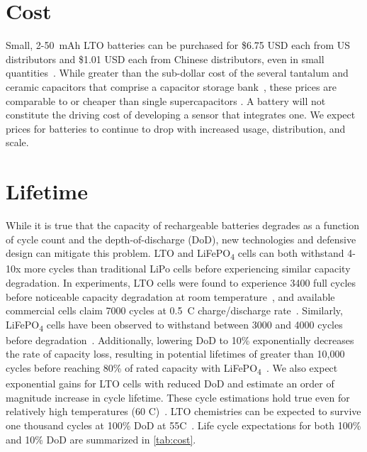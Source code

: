 \section{Cost}
\label{chap:battery-cost}
Small, 2-50~mAh LTO batteries can be purchased for
\$6.75 USD each from US distributors and \$1.01 USD each from Chinese distributors, even in small quantities~\cite{LTODatasheet, LTODatasheet2}. While greater than the sub-dollar cost of the several tantalum and ceramic capacitors that comprise a
capacitor storage bank~\cite{ceramicDatasheet, tantalumDatasheet}, these prices are comparable to or cheaper than single supercapacitors \cite{kemetCap, murataCap, seikoCap, bestCap}.
A battery will not constitute
the driving cost of developing a sensor that integrates one. We expect prices
for batteries to continue to drop with increased usage, distribution, and
scale.




\section{Lifetime}

While it is true that the capacity of rechargeable batteries degrades as a function
of cycle count and the depth-of-discharge (DoD), new technologies and defensive design
can mitigate this problem. LTO and LiFePO\textsubscript{4} cells can both withstand
4-10x more cycles than traditional
LiPo cells before experiencing similar capacity
degradation. In experiments, LTO cells were found to experience 3400 full
cycles before noticeable capacity degradation at room temperature~\cite{hallExperimental18}, and
available commercial cells claim 7000 cycles at 0.5~C charge/discharge
rate~\cite{LTODatasheet2}.
Similarly,
LiFePO\textsubscript{4} cells have been observed to withstand between 3000 and
4000 cycles before degradation~\cite{omarLithium14, wangCycle11,
sarasketaCycle15}.  Additionally, lowering DoD to 10\%
exponentially decreases the rate of capacity loss, resulting in potential
lifetimes of greater than 10,000 cycles before reaching 80\% of rated capacity
with LiFePO\textsubscript{4}~\cite{omarLithium14, wangCycle11}.
We
also expect exponential gains for LTO cells with reduced DoD and estimate an order
of magnitude increase in cycle lifetime.
These cycle estimations hold true even for relatively high temperatures (60\textdegree
C)~\cite{wangCycle11}.
LTO chemistries can be expected to survive one thousand
cycles at 100\% DoD at 55\textdegree C~\cite{han2014cycle}.
Life cycle
expectations for both 100\% and 10\% DoD are summarized in
\cref{tab:cost}.

